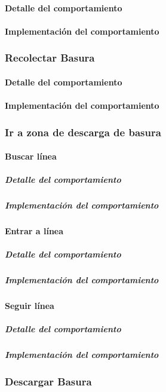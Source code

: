 \paragraph{Detalle del comportamiento}
\paragraph{Implementaci\'on del comportamiento}

\subsubsection{Recolectar Basura}
\label{collect_garbage}
\paragraph{Detalle del comportamiento}
\paragraph{Implementaci\'on del comportamiento}

\subsubsection{Ir a zona de descarga de basura}
\label{go_to_unload_zone}

\paragraph{Buscar l\'inea}
\label{find_line}
\subparagraph{Detalle del comportamiento}
\subparagraph{Implementaci\'on del comportamiento}

\paragraph{Entrar a l\'inea}
\label{enter_line}
\subparagraph{Detalle del comportamiento}
\subparagraph{Implementaci\'on del comportamiento}

\paragraph{Seguir l\'inea}
\label{follow_line}
\subparagraph{Detalle del comportamiento}
\subparagraph{Implementaci\'on del comportamiento}

\subsubsection{Descargar Basura}
\label{unload_garbage}
